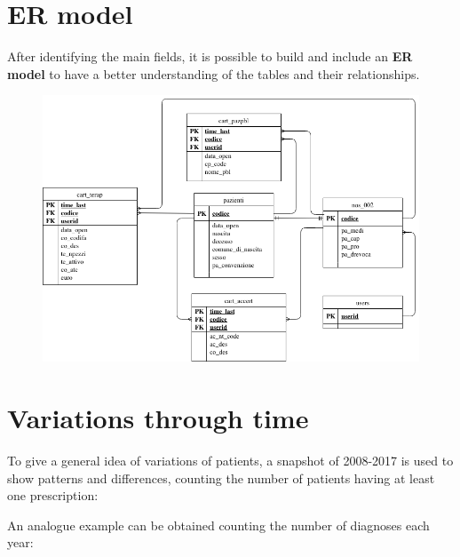 \section{ER model}
After identifying the main fields, it is possible to build and include an \textbf{ER model}\cite{draw} to have a better understanding of the tables and their relationships.
\begin{figure}[h]
	\centering
	\includegraphics[scale=0.3]{images/er.png} %
\end{figure}

\section{Variations through time}
To give a general idea of variations of patients, a snapshot of 2008-2017 is used to show patterns and differences, counting the number of patients having at least one prescription:

An analogue example can be obtained counting the number of diagnoses each year:


